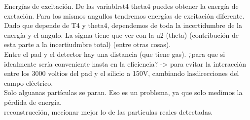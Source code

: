 \documentclass[12pt,a4paper]{article}
\numberwithin{equation}{section}
\numberwithin{figure}{section}
\begin{document}
Energías de excitación. De las variablrst4 theta4 puedes obtener la energía de exctación. Para los mismos angullos tendremos energías de excitación diferente. Dado que depende de T4 y theta4, dependemos de toda la incertidumbre de la energía y el angulo. La sigma tiene que ver con la u2 (theta) (contribución de esta parte a la incertiudmbre total) (entre otras cosas). \\

Entre el pad y el detector hay una distancia (que tiene gas). ¿para que si idealmente sería conveniente hasta en la eficiencia? -> para evitar la interacción entre los 3000 voltios del pad y el silicio a 150V, cambiando lasdirecciones del campo eléctrico. \\

Solo alguanas partículas se paran. Eso es un problema, ya que solo medimos la pérdida de energía.  \\

reconstrucción, mecionar mejor lo de las partículas reales detectadas. 
\end{document}
